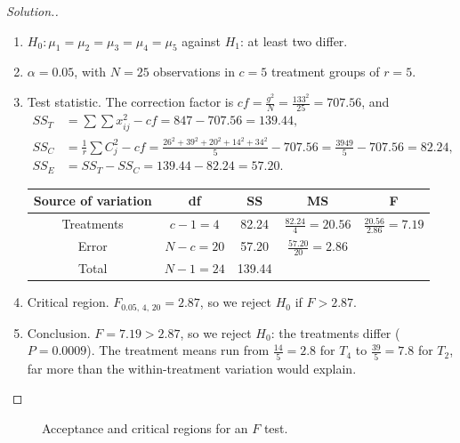 \documentclass[11pt,a4paper]{article}
\theoremstyle{definition}
\newenvironment{solution}
  {\renewcommand{\qedsymbol}{}\begin{proof}[\textit{Solution}.]}
  {\end{proof}}
\begin{document}
\begin{solution}
\begin{enumerate}
\item $H_0:\mu_1=\mu_2=\mu_3=\mu_4=\mu_5$ against $H_1$: at least two differ.
\item $\alpha = 0.05$, with $N = 25$ observations in $c = 5$ treatment groups of $r = 5$.
\item Test statistic. The correction factor is $cf = \frac{g^2}{N} = \frac{133^2}{25} = 707.56$, and
\begin{align*}
SS_T &= \sum\sum x_{ij}^2 - cf = 847 - 707.56 = 139.44,\\
SS_C &= \frac1r\sum C_j^2 - cf = \frac{26^2 + 39^2 + 20^2 + 14^2 + 34^2}{5} - 707.56 = \frac{3949}{5} - 707.56 = 82.24,\\
SS_E &= SS_T - SS_C = 139.44 - 82.24 = 57.20 .
\end{align*}
\begin{table}[H]
\centering
\begin{tabular}{|c|c|c|c|c|}
\hline
Source of variation & df & SS & MS & F\\
\hline
Treatments & $c-1=4$ & 82.24 & $\frac{82.24}{4}=20.56$ & $\frac{20.56}{2.86}=7.19$\\
Error & $N-c=20$ & 57.20 & $\frac{57.20}{20}=2.86$ & \\
\hline
Total & $N-1=24$ & 139.44 & & \\
\hline
\end{tabular}
\end{table}
\item Critical region. $F_{0.05,\,4,\,20} = 2.87$, so we reject $H_0$ if $F>2.87$.
\item Conclusion. $F = 7.19 > 2.87$, so we reject $H_0$: the treatments differ ($P = 0.0009$).
The treatment means run from $\frac{14}{5} = 2.8$ for $T_4$ to $\frac{39}{5} = 7.8$ for $T_2$,
far more than the within-treatment variation would explain.
\end{enumerate}
\end{solution}

\begin{figure}[H]
\centering
{}
\caption{Acceptance and critical regions for an $F$ test.}
\end{figure}
\end{document}
